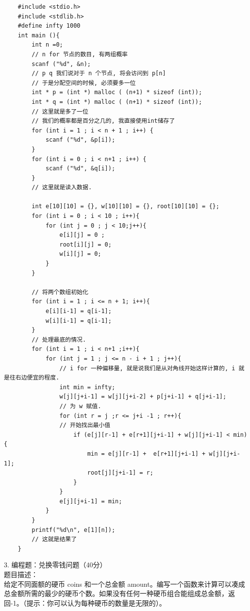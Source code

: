 \documentclass[a4paper, 10pt]{ctexart} %
\begin{document}
\begin{verbatim}
    #include <stdio.h> 
    #include <stdlib.h>
    #define infty 1000
    int main (){
        int n =0;
        // n for 节点的数目, 有两组概率
        scanf ("%d", &n);
        // p q 我们说对于 n 个节点, 将会访问到 p[n]
        // 于是分配空间的时候, 必须要多一位
        int * p = (int *) malloc ( (n+1) * sizeof (int));
        int * q = (int *) malloc ( (n+1) * sizeof (int));
        // 这里就是多了一位
        // 我们的概率都是百分之几的, 我直接使用int储存了
        for (int i = 1 ; i < n + 1 ; i++) {
            scanf ("%d", &p[i]);
        }
        for (int i = 0 ; i < n+1 ; i++) {
            scanf ("%d", &q[i]);
        }
        // 这里就是读入数据.

        int e[10][10] = {}, w[10][10] = {}, root[10][10] = {};
        for (int i = 0 ; i < 10 ; i++){
            for (int j = 0 ; j < 10;j++){
                e[i][j] = 0 ; 
                root[i][j] = 0;
                w[i][j] = 0;
            }
        }
        
        // 将两个数组初始化
        for (int i = 1 ; i <= n + 1; i++){
            e[i][i-1] = q[i-1];
            w[i][i-1] = q[i-1];
        }
        // 处理最底的情况. 
        for (int i = 1 ; i < n+1 ;i++){
            for (int j = 1 ; j <= n - i + 1 ; j++){
                // i for 一种偏移量, 就是说我们是从对角线开始这样计算的, i 就是往右边便宜的程度. 
                int min = infty;
                w[j][j+i-1] = w[j][j+i-2] + p[j+i-1] + q[j+i-1];
                // 为 w 赋值. 
                for (int r = j ;r <= j+i -1 ; r++){
                // 开始找出最小值
                    if (e[j][r-1] + e[r+1][j+i-1] + w[j][j+i-1] < min) {
                        min = e[j][r-1] +  e[r+1][j+i-1] + w[j][j+i-1];
                        root[j][j+i-1] = r;
                    }
                }
                e[j][j+i-1] = min;
            }
        }
        printf("%d\n", e[1][n]);
        // 这就是结果了
    }
\end{verbatim}

3. 编程题：兑换零钱问题（40分）\\
题目描述：\\
给定不同面额的硬币 coins 和一个总金额 amount。编写一个函数来计算可以凑成总金额所需的最少的硬币个数。如果没有任何一种硬币组合能组成总金额，返回-1。（提示：你可以认为每种硬币的数量是无限的）。
\end{document}
